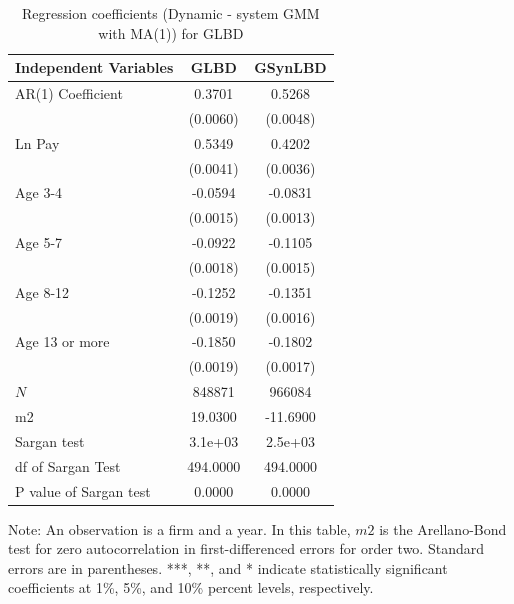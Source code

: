 \documentclass[10pt,twoside]{article}
\newcommand{\sym}[1]{\rlap{#1}}
\begin{document}
\begin{table}[H]
  \centering
\caption{Regression coefficients (Dynamic - system GMM with MA(1)) for GLBD} \label{tab:Dynamic - system GMM with MA(1)_ger} \medskip
\renewcommand{\arraystretch}{1}
\setlength{\tabcolsep}{14pt}
\begin{tabular}{l|c| c}
\toprule
\textbf{Independent Variables}&\textbf{GLBD} &\textbf{GSynLBD}\\
\midrule
AR(1) Coefficient&   0.3701\sym{***}&   0.5268\sym{***}\\
          & (0.0060)         & (0.0048)         \\
[1em]
Ln Pay    &   0.5349\sym{***}&   0.4202\sym{***}\\
          & (0.0041)         & (0.0036)         \\
[1em]
Age 3-4   &  -0.0594\sym{***}&  -0.0831\sym{***}\\
          & (0.0015)         & (0.0013)         \\
[1em]
Age 5-7   &  -0.0922\sym{***}&  -0.1105\sym{***}\\
          & (0.0018)         & (0.0015)         \\
[1em]
Age 8-12  &  -0.1252\sym{***}&  -0.1351\sym{***}\\
          & (0.0019)         & (0.0016)         \\
[1em]
Age 13 or more&  -0.1850\sym{***}&  -0.1802\sym{***}\\
          & (0.0019)         & (0.0017)         \\
\hline
\(N\)     &   848871         &   966084         \\
m2        &  19.0300         & -11.6900         \\
Sargan test&  3.1e+03         &  2.5e+03         \\
df of Sargan Test& 494.0000         & 494.0000         \\
P value of Sargan test&   0.0000         &   0.0000         \\
    \bottomrule
  \end{tabular} 
\begin{tablenotes}
\small
\item Note: An observation is a firm and a year. In this table, $m2$ is the Arellano-Bond test for zero autocorrelation in first-differenced errors for order two. Standard errors are in parentheses. ***, **, and * indicate statistically significant coefficients at 1\%, 5\%, and 10\% percent levels, respectively.
 \end{tablenotes}
\end{table}
\end{document}
